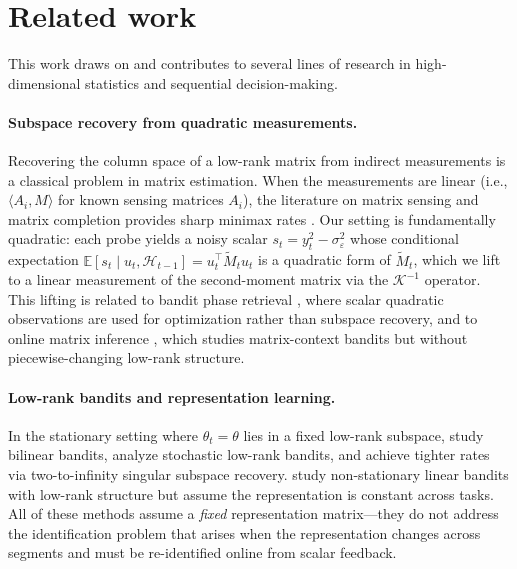 \documentclass[12pt]{article}
\newcommand{\E}{\mathbb{E}}
\newcommand{\cH}{\mathcal{H}}
\theoremstyle{plain}
\theoremstyle{definition}
\begin{document}
\section{Related work}
\label{sec:related}

This work draws on and contributes to several lines of research in high-dimensional statistics and sequential decision-making.

\paragraph{Subspace recovery from quadratic measurements.}
Recovering the column space of a low-rank matrix from indirect measurements is a classical problem in matrix estimation.
When the measurements are linear (i.e., $\langle A_i, M \rangle$ for known sensing matrices $A_i$), the literature on matrix sensing and matrix completion provides sharp minimax rates \citep{candes2011tight, rohde2011estimation, kacham2023adaptive}.
Our setting is fundamentally quadratic: each probe yields a noisy scalar $s_t = y_t^2 - \sigma_\varepsilon^2$ whose conditional expectation $\E[s_t \mid u_t, \cH_{t-1}] = u_t^\top \widetilde{M}_t u_t$ is a quadratic form of $\widetilde{M}_t$, which we lift to a linear measurement of the second-moment matrix via the $\mathcal{K}^{-1}$ operator.
This lifting is related to bandit phase retrieval \citep{lattimore2021phase}, where scalar quadratic observations are used for optimization rather than subspace recovery, and to online matrix inference \citep{han2025matrixinference}, which studies matrix-context bandits but without piecewise-changing low-rank structure.

\paragraph{Low-rank bandits and representation learning.}
In the stationary setting where $\theta_t = \theta$ lies in a fixed low-rank subspace, \citet{jun2019bilinear} study bilinear bandits, \citet{kveton2017stochastic} analyze stochastic low-rank bandits, and \citet{pmlr-v235-jedra24a} achieve tighter rates via two-to-infinity singular subspace recovery.
\citet{cesabianchi2023colt} study non-stationary linear bandits with low-rank structure but assume the representation is constant across tasks.
All of these methods assume a \emph{fixed} representation matrix---they do not address the identification problem that arises when the representation changes across segments and must be re-identified online from scalar feedback.
\end{document}
